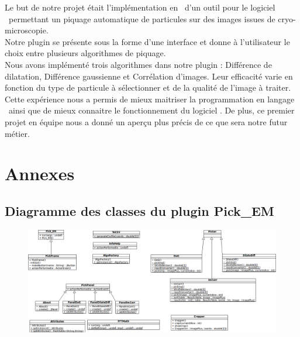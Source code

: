 \documentclass[12pt,a4paper]{report}
\begin{document}

Le but de notre projet était l'implémentation en \java ~d'un outil pour le logiciel \imj ~permettant un piquage automatique de particules sur des images issues de cryo-microscopie. \\
Notre plugin se présente sous la forme d'une interface et donne à l'utilisateur le choix entre plusieurs algorithmes de piquage. \\
Nous avons implémenté trois algorithmes dans notre plugin : Différence de dilatation, Différence gaussienne et Corrélation d'images. Leur efficacité varie en fonction du type de particule à sélectionner et de la qualité de l'image à traiter. \\

Cette expérience nous a permis de mieux maitriser la programmation en langage \java ~ainsi que de mieux connaitre le fonctionnement du logiciel \imj. De plus, ce premier projet en équipe nous a donné un aperçu plus précis de ce que sera notre futur métier. 





\appendix
\chapter{Annexes}


\newpage

\section{Diagramme des classes du plugin Pick\_EM}

\begin{figure}[!ht] 
\begin{center}
\includegraphics[width=1.4\textwidth, angle=90]{diagComplet.png}
\end{center}
\end{figure}
\end{document}
